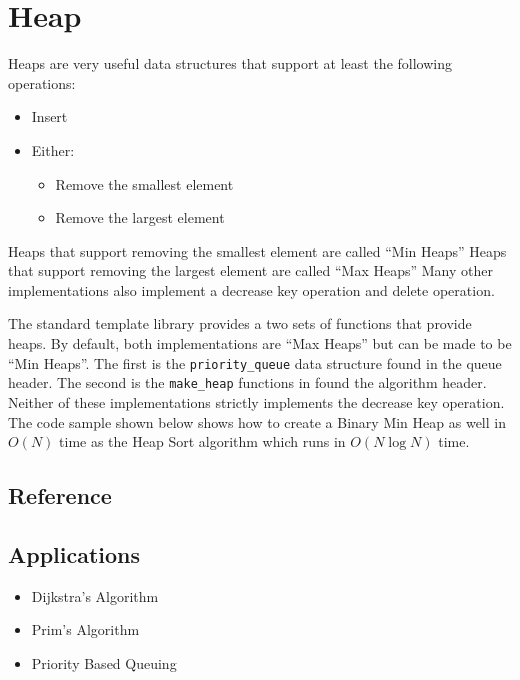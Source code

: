 \section{Heap}
Heaps are very useful data structures that support at least the following operations:


\begin{itemize}
	\item Insert
	\item Either:
		\begin{itemize}
			\item Remove the smallest element 
			\item Remove the largest element
		\end{itemize}
\end{itemize}

Heaps that support removing the smallest element are called ``Min Heaps''
Heaps that support removing the largest element are called ``Max Heaps''
Many other implementations also implement a decrease key operation and delete operation.

The standard template library provides a two sets of functions that provide heaps.
By default, both implementations are ``Max Heaps'' but can be made to be ``Min Heaps''.
The first is the \lstinline{priority_queue} data structure found in the queue header.
The second is the \lstinline{make_heap} functions in found the algorithm header.
Neither of these implementations strictly implements the decrease key operation.
The code sample shown below shows how to create a Binary Min Heap as well in $O(N)$ time as the Heap Sort algorithm which runs in $O(N \log N)$ time.

\subsection{Reference}

\subsection{Applications}
\begin{itemize}
	\item Dijkstra's Algorithm
	\item Prim's Algorithm
	\item Priority Based Queuing
\end{itemize}
